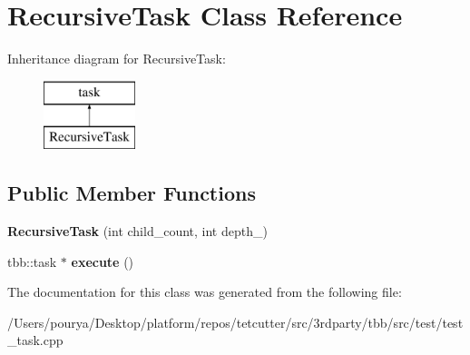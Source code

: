 \hypertarget{classRecursiveTask}{}\section{Recursive\+Task Class Reference}
\label{classRecursiveTask}
Inheritance diagram for Recursive\+Task\+:\begin{figure}[H]
\begin{center}
\leavevmode
\includegraphics[height=2.000000cm]{classRecursiveTask}
\end{center}
\end{figure}
\subsection*{Public Member Functions}
\begin{DoxyCompactItemize}
\item 
\hypertarget{classRecursiveTask_a5f7af134e7eb3c790fcbf839335a2f19}{}{\bfseries Recursive\+Task} (int child\+\_\+count, int depth\+\_\+)\label{classRecursiveTask_a5f7af134e7eb3c790fcbf839335a2f19}

\item 
\hypertarget{classRecursiveTask_a20414c07922c567f890beb684d53d4f4}{}tbb\+::task $\ast$ {\bfseries execute} ()\label{classRecursiveTask_a20414c07922c567f890beb684d53d4f4}

\end{DoxyCompactItemize}


The documentation for this class was generated from the following file\+:\begin{DoxyCompactItemize}
\item 
/\+Users/pourya/\+Desktop/platform/repos/tetcutter/src/3rdparty/tbb/src/test/test\+\_\+task.\+cpp\end{DoxyCompactItemize}
